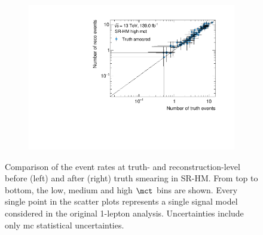 \begin{figure}
\begin{subfigure}[b]{0.49\linewidth}
	\end{subfigure}\hfill
	\begin{subfigure}[b]{0.49\linewidth}
		\centering\includegraphics[width=\textwidth]{yields_SR-HM_high_mct_smeared}
	\end{subfigure}
	\caption{Comparison of the event rates at truth- and reconstruction-level before (left) and after (right) truth smearing in SR-HM. From top to bottom, the low, medium and high $\mct$ bins are shown. Every single point in the scatter plots represents a single signal model considered in the original 1-lepton analysis. Uncertainties include only \gls{mc} statistical uncertainties.}
	\label{fig:smearing_signal_regions_3}
\end{figure}
